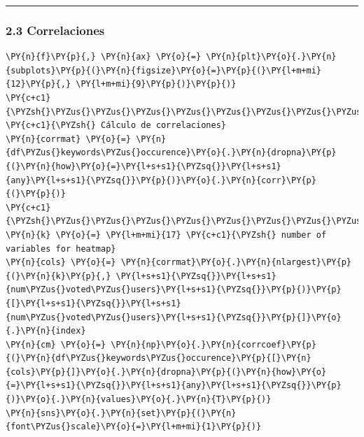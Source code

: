    \begin{center}\rule{0.5\linewidth}{\linethickness}\end{center}

\subsubsection{2.3 Correlaciones}\label{correlaciones}

    \begin{tcolorbox}[breakable, size=fbox, boxrule=1pt, pad at break*=1mm,colback=cellbackground, colframe=cellborder]
\begin{Verbatim}[commandchars=\\\{\}]
\PY{n}{f}\PY{p}{,} \PY{n}{ax} \PY{o}{=} \PY{n}{plt}\PY{o}{.}\PY{n}{subplots}\PY{p}{(}\PY{n}{figsize}\PY{o}{=}\PY{p}{(}\PY{l+m+mi}{12}\PY{p}{,} \PY{l+m+mi}{9}\PY{p}{)}\PY{p}{)}
\PY{c+c1}{\PYZsh{}\PYZus{}\PYZus{}\PYZus{}\PYZus{}\PYZus{}\PYZus{}\PYZus{}\PYZus{}\PYZus{}\PYZus{}\PYZus{}\PYZus{}\PYZus{}\PYZus{}\PYZus{}\PYZus{}\PYZus{}\PYZus{}\PYZus{}\PYZus{}\PYZus{}\PYZus{}\PYZus{}\PYZus{}\PYZus{}\PYZus{}\PYZus{}\PYZus{}\PYZus{}}
\PY{c+c1}{\PYZsh{} Cálculo de correlaciones}
\PY{n}{corrmat} \PY{o}{=} \PY{n}{df\PYZus{}keywords\PYZus{}occurence}\PY{o}{.}\PY{n}{dropna}\PY{p}{(}\PY{n}{how}\PY{o}{=}\PY{l+s+s1}{\PYZsq{}}\PY{l+s+s1}{any}\PY{l+s+s1}{\PYZsq{}}\PY{p}{)}\PY{o}{.}\PY{n}{corr}\PY{p}{(}\PY{p}{)}
\PY{c+c1}{\PYZsh{}\PYZus{}\PYZus{}\PYZus{}\PYZus{}\PYZus{}\PYZus{}\PYZus{}\PYZus{}\PYZus{}\PYZus{}\PYZus{}\PYZus{}\PYZus{}\PYZus{}\PYZus{}\PYZus{}\PYZus{}\PYZus{}\PYZus{}\PYZus{}\PYZus{}\PYZus{}\PYZus{}\PYZus{}\PYZus{}\PYZus{}\PYZus{}\PYZus{}\PYZus{}\PYZus{}\PYZus{}\PYZus{}\PYZus{}\PYZus{}\PYZus{}\PYZus{}\PYZus{}\PYZus{}\PYZus{}\PYZus{}}
\PY{n}{k} \PY{o}{=} \PY{l+m+mi}{17} \PY{c+c1}{\PYZsh{} number of variables for heatmap}
\PY{n}{cols} \PY{o}{=} \PY{n}{corrmat}\PY{o}{.}\PY{n}{nlargest}\PY{p}{(}\PY{n}{k}\PY{p}{,} \PY{l+s+s1}{\PYZsq{}}\PY{l+s+s1}{num\PYZus{}voted\PYZus{}users}\PY{l+s+s1}{\PYZsq{}}\PY{p}{)}\PY{p}{[}\PY{l+s+s1}{\PYZsq{}}\PY{l+s+s1}{num\PYZus{}voted\PYZus{}users}\PY{l+s+s1}{\PYZsq{}}\PY{p}{]}\PY{o}{.}\PY{n}{index}
\PY{n}{cm} \PY{o}{=} \PY{n}{np}\PY{o}{.}\PY{n}{corrcoef}\PY{p}{(}\PY{n}{df\PYZus{}keywords\PYZus{}occurence}\PY{p}{[}\PY{n}{cols}\PY{p}{]}\PY{o}{.}\PY{n}{dropna}\PY{p}{(}\PY{n}{how}\PY{o}{=}\PY{l+s+s1}{\PYZsq{}}\PY{l+s+s1}{any}\PY{l+s+s1}{\PYZsq{}}\PY{p}{)}\PY{o}{.}\PY{n}{values}\PY{o}{.}\PY{n}{T}\PY{p}{)}
\PY{n}{sns}\PY{o}{.}\PY{n}{set}\PY{p}{(}\PY{n}{font\PYZus{}scale}\PY{o}{=}\PY{l+m+mi}{1}\PY{p}{)}

\end{Verbatim}
\end{tcolorbox}

